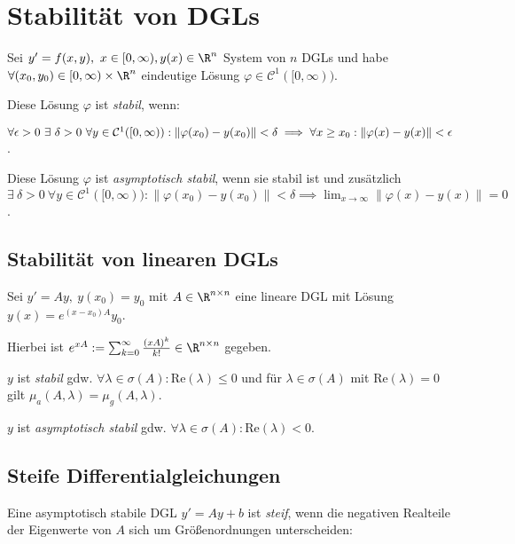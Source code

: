 \section*{Stabilität von DGLs}

Sei $y' = f(x,y), \ x \in [0,\infty), y(x) \in \R^n$ System von $n$ DGLs und habe $\forall (x_0, y_0) \in [0,\infty) \times \R^n$ eindeutige Lösung $\varphi \in \mathcal{C}^1([0,\infty))$.

\spacing

Diese Lösung $\varphi$ ist \emph{stabil}, wenn:

$\forall \epsilon > 0 \ \exists \ \delta > 0 \ \forall y \in \mathcal{C}^1([0,\infty)) : \\ \|\varphi(x_0) - y(x_0)\| < \delta \implies \forall x \geq x_0 : \|\varphi(x)-y(x)\| < \epsilon$.

\spacing

Diese Lösung $\varphi$ ist \emph{asymptotisch stabil}, wenn sie stabil ist und zusätzlich $\exists \ \delta > 0 \ \forall y \in \mathcal{C}^1([0,\infty)) : \|\varphi(x_0)-y(x_0)\| < \delta \implies \displaystyle\lim_{x \to \infty} \|\varphi(x)-y(x)\| = 0$.

\subsection*{Stabilität von linearen DGLs}

Sei $y'=Ay, \ y(x_0) = y_0$ mit $A \in \R^{n \times n}$ eine lineare DGL mit Lösung $y(x) = e^{(x-x_0)A}y_0$.

Hierbei ist $e^{xA} := \sum_{k=0}^\infty \frac{(xA)^k}{k!} \in \R^{n \times n}$ gegeben.

\spacing

$y$ ist \emph{stabil} gdw. $\forall \lambda \in \sigma(A) : \text{Re}(\lambda) \leq 0$ und für $\lambda \in \sigma(A)$ mit $\text{Re}(\lambda) = 0$ gilt $\mu_a(A,\lambda) = \mu_g(A,\lambda)$.

\spacing

$y$ ist \emph{asymptotisch stabil} gdw. $\forall \lambda \in \sigma(A) : \text{Re}(\lambda) < 0$.

\subsection*{Steife Differentialgleichungen}

Eine asymptotisch stabile DGL $y'=Ay+b$ ist \emph{steif}, wenn die negativen Realteile der Eigenwerte von $A$ sich um Größenordnungen unterscheiden:


